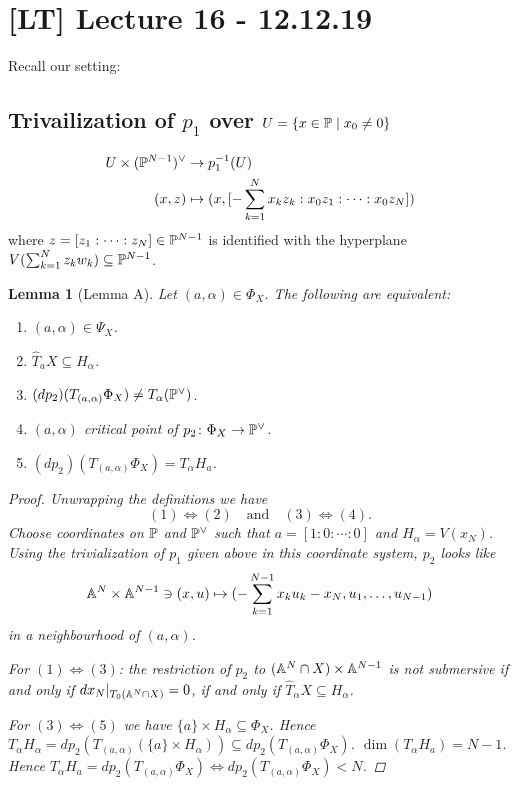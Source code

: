 \documentclass[A4paper, british, reqno]{amsart}
\theoremstyle{darkgreentheorem}
\newtheorem{lm}[thm]{Lemma}
\theoremstyle{darkbluedefinition}
\theoremstyle{darkredexample}
\theoremstyle{remark}
\newcommand{\1}{\mathbbm{1}}
\newcommand{\dual}{^{\vee}}
\newcommand{\sub}{\subseteq}
\begin{document}
\section{[LT] Lecture 16 - 12.12.19}

Recall our setting:
\begin{center}
\end{center}

\subsection{Trivailization of $p_{1}$ over $U=\{x\in \P\mid x_{0}\neq 0\}$}

\begin{align*}
    U\times (\P^{N-1})\dual & \to p_{1}^{-1}(U) \\
    (x,z) & \mapsto (x, [-\sum_{k=1}^{N} x_{k}z_{k}:x_{0}z_{1}:\cdots :x_{0}z_{N}])
\end{align*}
where $z=[z_{1}:\cdots :z_{N}]\in \P^{N-1}$ is identified with the hyperplane $V(\sum_{k=1}^{N}z_{k}w_{k})\sub \P^{N-1}$.

\begin{lm}[Lemma A]
    Let $(a,\alpha)\in \Phi_{X}$.
    The following are equivalent:
    \begin{enumerate}
	\item $(a,\alpha)\in \Psi_{X}$.
	\item $\hat{T}_{a}X\sub H_{\alpha}$.
	\item $(dp_{2})(T_{(a,\alpha)}\Phi_{X})\neq T_{\alpha}(\P\dual)$.
	\item $(a,\alpha)$ critical point of $p_{2}\colon \Phi_{X}\to \P\dual$.
	\item $(dp_{2})(T_{(a,\alpha)}\Phi_{X})=T_{\alpha}H_{a}$.
    \end{enumerate}
    \begin{proof}
	Unwrapping the definitions we have
	\[ (1)\Leftrightarrow (2) \quad \text{and} \quad (3)\Leftrightarrow (4). \]
	Choose coordinates on $\P$ and $\P\dual$ such that $a=[1:0:\cdots:0]$ and $H_{\alpha}=V(x_{N})$.
	Using the trivialization of $p_{1}$ given above in this coordinate system, $p_{2}$ looks like
	\[ \A^{N}\times \A^{N-1}\ni (x,u)\mapsto (-\sum_{k=1}^{N-1}x_{k}u_{k}-x_{N},u_{1},\ldots,u_{N-1}) \]
	in a neighbourhood of $(a,\alpha)$.
	
	For $(1)\Leftrightarrow (3)$: the restriction of $p_{2}$ to $(\A^{N}\cap X)\times \A^{N-1}$ is not submersive if and only if $dx_{N}|_{T_{0}(\A^{N}\cap X)}=0$, if and only if $\hat{T}_{\alpha}X\sub H_{\alpha}$.

	For $(3)\Leftrightarrow (5)$ we have $\{a\}\times H_{\alpha}\sub \Phi_{X}$.
	Hence $T_{\alpha}H_{\alpha}=dp_{2}(T_{(a,\alpha)}(\{a\}\times H_{\alpha}))\sub dp_{2}(T_{(a,\alpha)}\Phi_{X})$.
	$\dim(T_{\alpha}H_{a})=N-1$.
	Hence $T_{\alpha}H_{a}=dp_{2}(T_{(a,\alpha)}\Phi_{X}) \Leftrightarrow dp_{2}(T_{(a,\alpha)}\Phi_{X}) < N$.
    \end{proof}
\end{lm}
\end{document}

